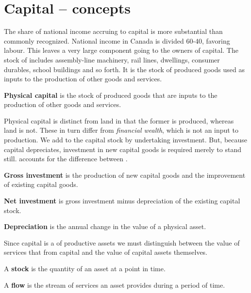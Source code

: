 \section{Capital -- concepts}\label{sec:ch12sec4}

The share of national income accruing to capital is more substantial than
commonly recognized. National income in Canada is divided 60-40, favoring
labour. This leaves a very large component going to the owners of capital.
The stock of  includes assembly-line
machinery, rail lines, dwellings, consumer durables, school buildings and so
forth. It is the stock of produced goods used as inputs to the production of
other goods and services.

\begin{DefBox}
\textbf{Physical capital} is the stock of produced goods that are inputs to the production of other goods and services.
\end{DefBox}

Physical capital is distinct from land in that the former is produced,
whereas land is not. These in turn differ from \textit{financial wealth},
which is not an input to production. We add to the capital stock by
undertaking investment. But, because capital depreciates, investment in new
capital goods is required merely to stand still. 
accounts for the difference between .

\begin{DefBox}
\textbf{Gross investment} is the production of new capital goods and the improvement of existing capital goods.

\textbf{Net investment} is gross investment minus depreciation of the existing capital stock.

\textbf{Depreciation} is the annual change in the value of a physical asset.
\end{DefBox}

\newhtmlpage

Since capital is a  of productive assets we must
distinguish between the value of services that  from
capital and the value of capital assets themselves.

\begin{DefBox}
A \textbf{stock} is the quantity of an asset at a point in time.

A \textbf{flow} is the stream of services an asset provides during a period of time.
\end{DefBox}

